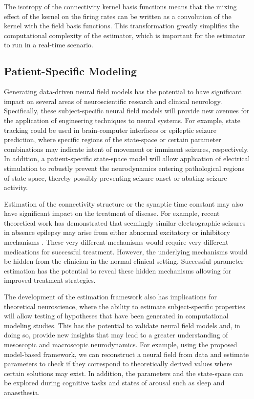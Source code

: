\documentclass[review,authoryear,3p]{elsarticle}
\begin{document}
The isotropy of the connectivity kernel basis functions means that the mixing effect of the kernel on the firing rates can be written as a convolution of the kernel with the field basis functions. This transformation greatly simplifies the computational complexity of the estimator, which is important for the estimator to run in a real-time scenario.

\subsection{Patient-Specific Modeling}
Generating data-driven neural field models has the potential to have significant impact on several areas of neuroscientific research and clinical neurology. Specifically, these subject-specific neural field models will provide new avenues for the application of engineering techniques to neural systems. For example, state tracking could be used in brain-computer interfaces or epileptic seizure prediction, where specific regions of the state-space or certain parameter combinations may indicate intent of movement or imminent seizures, respectively. In addition, a patient-specific state-space model will allow application of electrical stimulation to robustly prevent the neurodynamics entering pathological regions of state-space, thereby possibly preventing seizure onset or abating seizure activity.

Estimation of the connectivity structure or the synaptic time constant may also have significant impact on the treatment of disease. For example, recent theoretical work has demonstrated that seemingly similar electrographic seizures in absence epilepsy may arise from either abnormal excitatory or inhibitory mechanisms \citep{Marten2009}. These very different mechanisms would require very different medications for successful treatment. However, the underlying mechanisms would be hidden from the clinician in the normal clinical setting. Successful parameter estimation has the potential to reveal these hidden mechanisms allowing for improved treatment strategies. 

The development of the estimation framework also has implications for theoretical neuroscience, where the ability to estimate subject-specific properties will allow testing of hypotheses that have been generated in computational modeling studies. This has the potential to validate neural field models and, in doing so, provide new insights that may lead to a greater understanding of mesoscopic and macroscopic neurodynamics. For example, using the proposed model-based framework, we can reconstruct a neural field from data and estimate parameters to check if they correspond to theoretically derived values where certain solutions may exist. In addition, the parameters and the state-space can be explored during cognitive tasks and states of arousal such as sleep and anaesthesia. 
\end{document}
